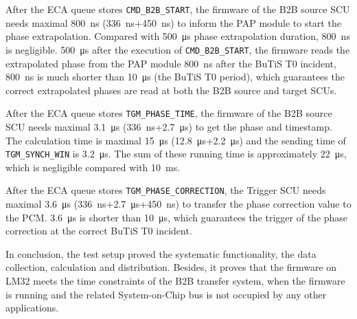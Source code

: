 After the ECA queue stores \verb|CMD_B2B_START|, the firmware of the B2B source SCU needs maximal \SI{800}{\ns} (\SI{336}{\ns}+\SI{450}{\ns}) to inform the PAP module to start the phase extrapolation. Compared with \SI{500}{\us} phase extrapolation duration,  \SI{800}{\ns} is negligible. \SI{500}{\us} after the execution of \verb|CMD_B2B_START|, the firmware reads the extrapolated phase from the PAP module \SI{800}{\ns} after the BuTiS T0 incident, \SI{800}{\ns} is much shorter than \SI{10}{\us} (the BuTiS T0 period), which guarantees the correct extrapolated phases are read at both the B2B source and target SCUs. 

After the ECA queue stores \verb|TGM_PHASE_TIME|, the firmware of the B2B source SCU needs maximal \SI{3.1}{\us} (\SI{336}{\ns}+\SI{2.7}{\us}) to get the phase and timestamp. The calculation time is maximal \SI{15}{\us} (\SI{12.8}{\us}+\SI{2.2}{\us}) and the sending time of \verb|TGM_SYNCH_WIN| is \SI{3.2}{\us}. The sum of these running time is approximately \SI{22}{\us}, which is negligible compared with \SI{10}{\ms}.

After the ECA queue stores \verb|TGM_PHASE_CORRECTION|, the Trigger SCU needs maximal \SI{3.6}{\us} (\SI{336}{\ns}+\SI{2.7}{\us}+\SI{450}{\ns}) to transfer the phase correction value to the PCM. \SI{3.6}{\us} is shorter than \SI{10}{\us}, which guarantees the trigger of the phase correction at the correct BuTiS T0 incident.

In conclusion, the test setup proved the systematic functionality, the data collection, calculation and distribution. Besides, it proves that the firmware on LM32 meets the time constraints of the B2B transfer system, when the firmware is running and the related System-on-Chip bus is not occupied by any other applications. 






